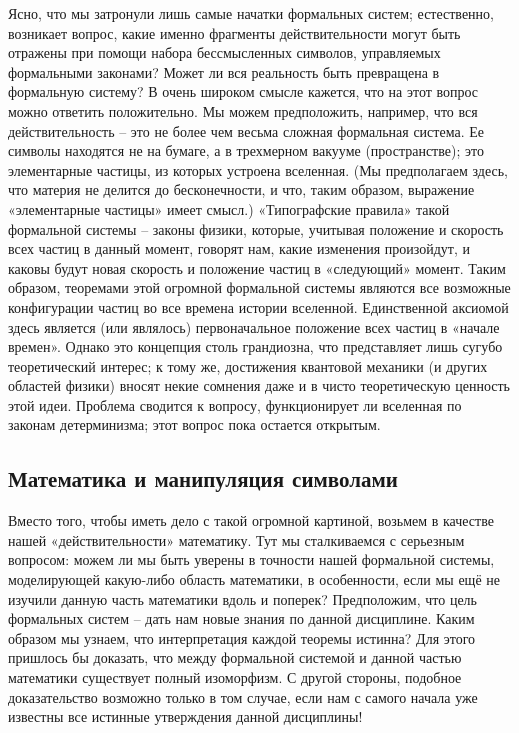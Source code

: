 \documentclass[../main.tex]{subfiles}
\begin{document}
Ясно, что мы затронули лишь самые начатки формальных систем; естественно, возникает вопрос, какие именно фрагменты действительности могут быть отражены при помощи набора бессмысленных символов, управляемых формальными законами? Может ли вся реальность быть превращена в формальную систему? В очень широком смысле кажется, что на этот вопрос можно ответить положительно. Мы можем предположить, например, что вся действительность \--- это не более чем весьма сложная формальная система. Ее символы находятся не на бумаге, а в трехмерном вакууме (пространстве); это элементарные частицы, из которых устроена вселенная. (Мы предполагаем здесь, что материя не делится до бесконечности, и что, таким образом, выражение «элементарные частицы» имеет смысл.) «Типографские правила» такой формальной системы \--- законы физики, которые, учитывая положение и скорость всех частиц в данный момент, говорят нам, какие изменения произойдут, и каковы будут новая скорость и положение частиц в «следующий» момент. Таким образом, теоремами этой огромной формальной системы являются все возможные конфигурации частиц во все времена истории вселенной. Единственной аксиомой здесь является (или являлось) первоначальное положение всех частиц в «начале времен». Однако это концепция столь грандиозна, что представляет лишь сугубо теоретический интерес; к тому же, достижения квантовой механики (и других областей физики) вносят некие сомнения даже и в чисто теоретическую ценность этой идеи. Проблема сводится к вопросу, функционирует ли вселенная по законам детерминизма; этот вопрос пока остается открытым.


\subsection{Математика и манипуляция символами}

Вместо того, чтобы иметь дело с такой огромной картиной, возьмем в качестве нашей «действительности» математику. Тут мы сталкиваемся с серьезным вопросом: можем ли мы быть уверены в точности нашей формальной системы, моделирующей какую-либо область математики, в особенности, если мы ещё не изучили данную часть математики вдоль и поперек? Предположим, что цель формальных систем \--- дать нам новые знания по данной дисциплине. Каким образом мы узнаем, что интерпретация каждой теоремы истинна? Для этого пришлось бы доказать, что между формальной системой и данной частью математики существует полный изоморфизм. С другой стороны, подобное доказательство возможно только в том случае, если нам с самого начала уже известны все истинные утверждения данной дисциплины!
\end{document}
